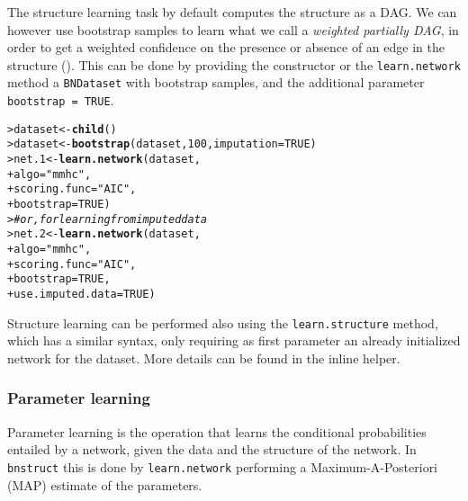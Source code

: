 \documentclass{article}\usepackage[]{graphicx}\usepackage[]{color}
\makeatletter
\newcommand{\hlnum}[1]{\textcolor[rgb]{0.686,0.059,0.569}{#1}}%
\newcommand{\hlstr}[1]{\textcolor[rgb]{0.192,0.494,0.8}{#1}}%
\newcommand{\hlcom}[1]{\textcolor[rgb]{0.678,0.584,0.686}{\textit{#1}}}%
\newcommand{\hlstd}[1]{\textcolor[rgb]{0.345,0.345,0.345}{#1}}%
\newcommand{\hlkwb}[1]{\textcolor[rgb]{0.69,0.353,0.396}{#1}}%
\newcommand{\hlkwc}[1]{\textcolor[rgb]{0.333,0.667,0.333}{#1}}%
\newcommand{\hlkwd}[1]{\textcolor[rgb]{0.737,0.353,0.396}{\textbf{#1}}}%
\newenvironment{kframe}{%
 \def\at@end@of@kframe{}%
 \ifinner\ifhmode%
  \def\at@end@of@kframe{\end{minipage}}%
  \begin{minipage}{\columnwidth}%
 \fi\fi%
 \def\FrameCommand##1{\hskip\@totalleftmargin \hskip-\fboxsep
 \colorbox{shadecolor}{##1}\hskip-\fboxsep
     \hskip-\linewidth \hskip-\@totalleftmargin \hskip\columnwidth}%
 \MakeFramed {\advance\hsize-\width
   \@totalleftmargin\z@ \linewidth\hsize
   \@setminipage}}%
 {\par\unskip\endMakeFramed%
 \at@end@of@kframe}
\newenvironment{knitrout}{}{} %
\newcommand{\Robject}[1]{{\texttt{#1}}}
\newcommand{\Rpackage}[1]{{\texttt{#1}}}
\newcommand{\Rmethod}[1]{{\texttt{#1}}}
\newcommand{\Rfunarg}[1]{{\texttt{#1}}}
\makeatother
\begin{document}
The structure learning task by default computes the structure as a DAG. We can however use
bootstrap samples to learn what we call a \textit{weighted partially DAG}, in order to get a weighted confidence on the presence or
absence of an edge in the structure (\citet*{friedman1999data}). This can be done by providing the constructor or the \Rmethod{learn.network}
method a \Robject{BNDataset} with bootstrap samples, and the additional parameter \Rfunarg{bootstrap = TRUE}.
\begin{knitrout}
\color{fgcolor}\begin{kframe}
\begin{alltt}
\hlstd{> }\hlstd{dataset} \hlkwb{<-} \hlkwd{child}\hlstd{()}
\hlstd{> }\hlstd{dataset} \hlkwb{<-} \hlkwd{bootstrap}\hlstd{(dataset,} \hlnum{100}\hlstd{,} \hlkwc{imputation} \hlstd{=} \hlnum{TRUE}\hlstd{)}
\hlstd{> }\hlstd{net.1}   \hlkwb{<-} \hlkwd{learn.network}\hlstd{(dataset,}
\hlstd{+ }                         \hlkwc{algo} \hlstd{=} \hlstr{"mmhc"}\hlstd{,}
\hlstd{+ }                         \hlkwc{scoring.func} \hlstd{=} \hlstr{"AIC"}\hlstd{,}
\hlstd{+ }                         \hlkwc{bootstrap} \hlstd{=} \hlnum{TRUE}\hlstd{)}
\hlstd{> }\hlcom{# or, for learning from imputed data}
\hlstd{> }\hlstd{net.2}   \hlkwb{<-} \hlkwd{learn.network}\hlstd{(dataset,}
\hlstd{+ }                         \hlkwc{algo} \hlstd{=} \hlstr{"mmhc"}\hlstd{,}
\hlstd{+ }                         \hlkwc{scoring.func} \hlstd{=} \hlstr{"AIC"}\hlstd{,}
\hlstd{+ }                         \hlkwc{bootstrap} \hlstd{=} \hlnum{TRUE}\hlstd{,}
\hlstd{+ }                         \hlkwc{use.imputed.data} \hlstd{=} \hlnum{TRUE}\hlstd{)}
\end{alltt}
\end{kframe}
\end{knitrout}

Structure learning can be performed also using the \Rmethod{learn.structure} method, which has a similar syntax, only requiring as
first parameter an already initialized network for the dataset. More details can be found in the inline helper.

\subsubsection{Parameter learning}
Parameter learning is the operation that learns the conditional probabilities entailed by a network,
given the data and the structure of the network. In \Rpackage{bnstruct} this is done by \Rmethod{learn.network}
performing a Maximum-A-Posteriori (MAP) estimate of the parameters.
\end{document}
